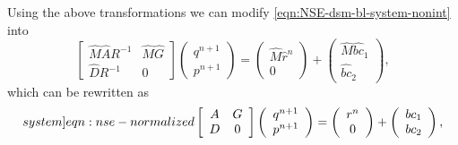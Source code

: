 \documentclass{article}
\numberwithin{equation}{section}
\begin{document}
Using the above transformations we can modify \cref{eqn:NSE-dsm-bl-system-nonint}
into 
\begin{equation*}
\left[\begin{array}{cc}
\hat{M}\hat{A}R^{-1} & \hat{M}\hat{G} \\
\hat{D}R^{-1} & 0
\end{array}\right]\left(\begin{array}{c}
q^{n+1} \\
p^{n+1}
\end{array}\right)=\left(\begin{array}{c}
\hat{M}\hat{r}^n \\
0
\end{array}\right)+\left(\begin{array}{c}
\hat{M}\widehat{b c}_1 \\
\widehat{b c}_2
\end{array}\right),
\end{equation*}
which can be rewritten as 
\begin{equation}\label[system]{eqn:nse-normalized}
\left[\begin{array}{cc}
A & G \\
D & 0
\end{array}\right]\left(\begin{array}{c}
q^{n+1} \\
p^{n+1}
\end{array}\right)=\left(\begin{array}{c}
r^n \\
0
\end{array}\right)+\left(\begin{array}{c}
{b c}_1 \\
{b c}_2
\end{array}\right),
\end{equation}
\end{document}

